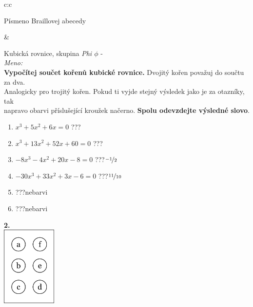 \documentclass[10pt]{report}
\begin{document}
\begin{tabular}{c:c}
\begin{minipage}[c][99mm][t]{0.49\linewidth}
\begin{center}
\begin{minipage}{0.20\linewidth}
\begin{center}
{\small Písmeno Braillovej abecedy}
\end{center}
\end{minipage}
\end{center}
\end{minipage}
&
\begin{minipage}[c][99mm][t]{0.49\linewidth}
\begin{center}
\vspace{7mm}
{\huge Kubická rovnice, skupina \textit{Phi $\phi$} -}\\[4.5mm]
\textit{Meno:}\phantom{xxxxxxxxxxxxxxxxxxxxxxxxxxxxxxxxxxxxxxxxxxxxxxxxxxxxxxxxxxxxxxxxx}\\[3.5mm]
\textbf{Vypočítej součet kořenů kubické rovnice.} Dvojitý kořen považuj do součtu za dva.\\Analogicky pro trojitý kořen. Pokud ti vyjde stejný výsledek jako je za otazníky, tak\\napravo obarvi příslušející kroužek načerno. \textbf{Spolu odevzdejte výsledné slovo}.\\[3mm]
\begin{minipage}{0.77\linewidth}
\begin{center}
\begin{varwidth}{\textwidth}
\begin{enumerate}
\large
\item $x^3+5x^2+6x=0$\quad \dotfill\; ???\;\dotfill {}
\item $x^3+13x^2+52x+60=0$\quad \dotfill\; ???\;\dotfill {}
\item $-8x^3-4x^2+20x-8=0$\quad \dotfill\; ???\;\dotfill \quad $\nicefrac{-1}{2}$
\item $-30x^3+33x^2+3x-6=0$\quad \dotfill\; ???\;\dotfill \quad $\nicefrac{11}{10}$
\item \quad \dotfill\; ???\;\dotfill \quad nebarvi
\item \quad \dotfill\; ???\;\dotfill \quad nebarvi
\end{enumerate}
\end{varwidth}
\end{center}
\end{minipage}
\begin{minipage}{0.20\linewidth}
\begin{center}
{\Huge\bfseries 2.} \\[2mm]
\includegraphics[height=40mm]{../images/braille.png}

\end{center}
\end{minipage}
\end{center}
\end{minipage}
\end{tabular}
\end{document}
